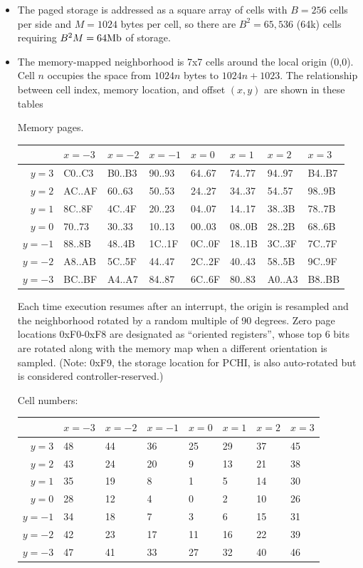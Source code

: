 \documentclass{article}
\begin{document}
  
  \begin{itemize}
  \item The paged storage is addressed as a square array of cells
    with $B=256$ cells per side and $M=1024$ bytes per cell,
    so there are $B^2 = 65,536$ (64k) cells requiring $B^2 M = 64\mathrm{Mb}$ of storage.
  \item The memory-mapped neighborhood is 7x7 cells around the local origin (0,0).
    Cell $n$ occupies the space from $1024n$ bytes to $1024n+1023$.
    The relationship between cell index, memory location, and offset $(x,y)$ are shown in these tables

    \noindent
    Memory pages.

    \noindent
 \begin{tabular}{r|lllllll}
        & $x=-3$ & $x=-2$ & $x=-1$ & $x=0$ & $x=1$ & $x=2$ & $x=3$ \\ \hline
 $y=3$ & C0..C3 & B0..B3 & 90..93 & 64..67 & 74..77 & 94..97 & B4..B7 \\
 $y=2$ & AC..AF & 60..63 & 50..53 & 24..27 & 34..37 & 54..57 & 98..9B \\
 $y=1$ & 8C..8F & 4C..4F & 20..23 & 04..07 & 14..17 & 38..3B & 78..7B \\
 $y=0$ & 70..73 & 30..33 & 10..13 & 00..03 & 08..0B & 28..2B & 68..6B \\
$y=-1$ & 88..8B & 48..4B & 1C..1F & 0C..0F & 18..1B & 3C..3F & 7C..7F \\
$y=-2$ & A8..AB & 5C..5F & 44..47 & 2C..2F & 40..43 & 58..5B & 9C..9F \\
$y=-3$ & BC..BF & A4..A7 & 84..87 & 6C..6F & 80..83 & A0..A3 & B8..BB
 \end{tabular}

 Each time execution resumes after an interrupt,
the origin is resampled and the neighborhood rotated by a random multiple of 90 degrees.
Zero page locations 0xF0-0xF8 are designated as ``oriented registers'',
whose top 6 bits are rotated along with the memory map when a different orientation is sampled.
(Note: 0xF9, the storage location for PCHI, is also auto-rotated but is considered controller-reserved.)

 \noindent
 Cell numbers:
 
 \noindent
 \begin{tabular}{r|lllllll}
       & $x=-3$ & $x=-2$ & $x=-1$ & $x=0$ & $x=1$ & $x=2$ & $x=3$ \\ \hline
 $y=3$ & 48 & 44 & 36 & 25 & 29 & 37 & 45 \\
 $y=2$ & 43 & 24 & 20 & 9 & 13 & 21 & 38 \\
 $y=1$ & 35 & 19 & 8 & 1 & 5 & 14 & 30 \\
 $y=0$ & 28 & 12 & 4 & 0 & 2 & 10 & 26 \\
$y=-1$ & 34 & 18 & 7 & 3 & 6 & 15 & 31 \\
$y=-2$ & 42 & 23 & 17 & 11 & 16 & 22 & 39 \\
$y=-3$ & 47 & 41 & 33 & 27 & 32 & 40 & 46
   \end{tabular}


\end{itemize}
\end{document}

